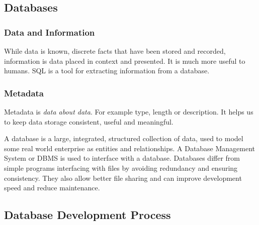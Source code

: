 \documentclass[12pt]{report}
\begin{document}
\begin{flushleft}

\section*{Databases}

\subsubsection*{Data and Information}

While data is known, discrete facts that have been stored and recorded,
information is data placed in context and presented. It is much more useful to
humans. SQL is a tool for extracting information from a database.

\subsubsection*{Metadata}

Metadata is \textit{data about data}. For example type, length or description.
It helps us to keep data storage consistent, useful and meaningful.

A database is a large, integrated, structured collection of data, used to model
some real world enterprise as entities and relationships. A Database Management
System or DBMS is used to interface with a database. Databases differ from
simple programs interfacing with files by avoiding redundancy and ensuring
consistency. They also allow better file sharing and can improve development
speed and reduce maintenance. 

\subsection*{Database Development Process}


\end{flushleft}
\end{document}
